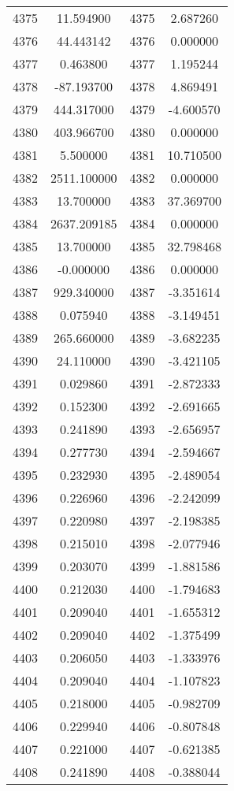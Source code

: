 \documentclass[12pt]{article}
\begin{document}
\begin{longtable}{@{}cccc@{}}
4375 & 11.594900 & 4375 & 2.687260 \\
4376 & 44.443142 & 4376 & 0.000000 \\
4377 & 0.463800 & 4377 & 1.195244 \\
4378 & -87.193700 & 4378 & 4.869491 \\
4379 & 444.317000 & 4379 & -4.600570 \\
4380 & 403.966700 & 4380 & 0.000000 \\
4381 & 5.500000 & 4381 & 10.710500 \\
4382 & 2511.100000 & 4382 & 0.000000 \\
4383 & 13.700000 & 4383 & 37.369700 \\
4384 & 2637.209185 & 4384 & 0.000000 \\
4385 & 13.700000 & 4385 & 32.798468 \\
4386 & -0.000000 & 4386 & 0.000000 \\
4387 & 929.340000 & 4387 & -3.351614 \\
4388 & 0.075940 & 4388 & -3.149451 \\
4389 & 265.660000 & 4389 & -3.682235 \\
4390 & 24.110000 & 4390 & -3.421105 \\
4391 & 0.029860 & 4391 & -2.872333 \\
4392 & 0.152300 & 4392 & -2.691665 \\
4393 & 0.241890 & 4393 & -2.656957 \\
4394 & 0.277730 & 4394 & -2.594667 \\
4395 & 0.232930 & 4395 & -2.489054 \\
4396 & 0.226960 & 4396 & -2.242099 \\
4397 & 0.220980 & 4397 & -2.198385 \\
4398 & 0.215010 & 4398 & -2.077946 \\
4399 & 0.203070 & 4399 & -1.881586 \\
4400 & 0.212030 & 4400 & -1.794683 \\
4401 & 0.209040 & 4401 & -1.655312 \\
4402 & 0.209040 & 4402 & -1.375499 \\
4403 & 0.206050 & 4403 & -1.333976 \\
4404 & 0.209040 & 4404 & -1.107823 \\
4405 & 0.218000 & 4405 & -0.982709 \\
4406 & 0.229940 & 4406 & -0.807848 \\
4407 & 0.221000 & 4407 & -0.621385 \\
4408 & 0.241890 & 4408 & -0.388044 \\

\end{longtable}
\end{document}
